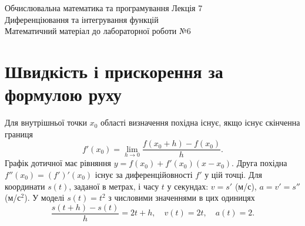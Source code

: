 \documentclass[11pt,a4paper]{article}
\begin{document}
{\small Обчислювальна математика та програмування \hfill Лекція 7}\\[4mm]
{\LARGE Диференціювання та інтегрування функцій}\\[2mm]
Математичний матеріал до лабораторної роботи №6
\section{Швидкість і прискорення за формулою руху}
Для внутрішньої точки $x_0$ області визначення похідна існує, якщо існує скінченна границя
\[
 f'(x_0)=\lim_{h\to0}\frac{f(x_0+h)-f(x_0)}{h}.
\]
Графік дотичної має рівняння $y=f(x_0)+f'(x_0)(x-x_0)$.
Друга похідна $f''(x_0)=(f')'(x_0)$ існує за диференційовності $f'$ у цій точці.
Для координати $s(t)$, заданої в метрах, і часу $t$ у секундах: $v=s'$ (м/с), $a=v'=s''$ (м/с$^2$).
У моделі $s(t)=t^2$ з числовими значеннями в цих одиницях
\[
\frac{s(t+h)-s(t)}h=2t+h,\quad v(t)=2t,\quad a(t)=2.
\]
\end{document}
